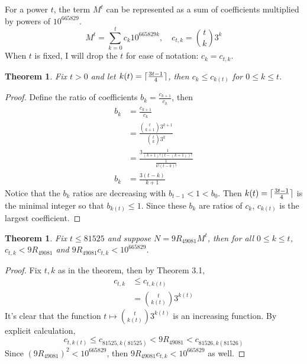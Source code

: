 \documentclass{amsart}
\newcommand{\RE}{{49081}}
\newcommand{\ME}{{665829}}
\DeclarePairedDelimiter\ceil{\lceil}{\rceil}
\numberwithin{equation}{section}
\theoremstyle{plain} %
\newtheorem{thm}[equation]{Theorem}
\theoremstyle{definition}
\theoremstyle{remark}
\begin{document}
 For a power $t$, the term $M^t$ can be represented as a sum of coefficients multiplied by powers of $10^\ME$.
$$M^t = \sum_{k = 0}^t c_k  10^{\ME k}, \quad c_{t,k} = \binom{t}{k} 3^k $$
When $t$ is fixed, I will drop the $t$ for ease of notation: $c_{k} = c_{t,k}$.
\begin{thm} Fix $t> 0$ and let $k(t) =  \ceil{\frac{3t-1}{4}}$, then $ c_{k} \leq c_{k(t)}$ for $0 \leq k \leq t$.
\end{thm}
\begin{proof}
Define the ratio of coefficients $b_k = \frac{c_{k+1}}{c_k}$, then 
\begin{align*}
b_k &=  \frac{c_{k+1}}{c_k}\\
&= \frac{ \binom{t}{k+1} 3^{k+1}}{ \binom{t}{k} 3^k}\\
&=  \frac{3  \frac{1}{(k+1)! (t - (k+1))!}}{\frac{1}{k! (t - k)!}}\\
b_k &= \frac{ 3(t-k)}{k + 1}
\end{align*}
Notice that the $b_k$ ratios are decreasing with $b_{t-1} < 1 < b_0$. Then $k(t) = \ceil{\frac{3t-1}{4}}$ is the minimal integer so that $b_{k(t)} \leq  1$. Since these $b_k$ are ratios of $c_k$, $c_{k(t)}$ is the largest coefficient. 
\end{proof}
\begin{thm} Fix $t \leq 81525$ and suppose $N = 9 R_{49081} M^t$, then for all $0 \leq k \leq t$,  $c_{t,k} < 9R_{\RE}$ and $9 R_{\RE} c_{t,k} < 10^\ME$.
\end{thm}
\begin{proof}
Fix $t,k$ as in the theorem, then by Theorem 3.1,
\begin{align*}
c_{t,k} & \leq c_{t,k(t)} \\
&= \binom{t}{k(t)} 3^{k(t)}
\end{align*}
It's clear that the function $t \mapsto   \binom{t}{k(t)} 3^{k(t)}$ is an increasing function. By explicit calculation,$$ c_{t,k(t)} \leq  c_{81525,k(81525)}  < 9R_\RE < c_{81526,k(81526)} $$
Since $(9R_{\RE})^2 < 10^\ME$, then  $9 R_{\RE} c_{t,k} < 10^\ME$ as well.

\end{proof}
\end{document}
